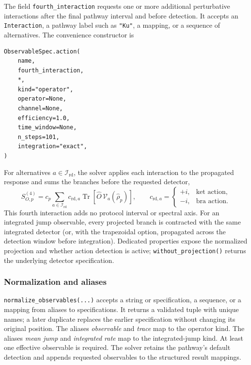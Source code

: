 \documentclass[11pt]{article}
\begin{document}
The field \texttt{fourth\_interaction} requests one or more additional perturbative interactions after the final pathway interval and before detection. It accepts an \texttt{Interaction}, a pathway label such as \texttt{"Ku"}, a mapping, or a sequence of alternatives. The convenience constructor is
\begin{verbatim}
ObservableSpec.action(
    name,
    fourth_interaction,
    *,
    kind="operator",
    operator=None,
    channel=None,
    efficiency=1.0,
    time_window=None,
    n_steps=101,
    integration="exact",
)
\end{verbatim}
For alternatives $a\in\mathcal{I}_{\mathrm{rd}}$, the solver applies each interaction to the propagated response and sums the branches before the requested detector,
\begin{equation}
    S_{O,p}^{(4)}=
    c_p\sum_{a\in\mathcal{I}_{\mathrm{rd}}}c_{\mathrm{rd},a}
    \operatorname{Tr}\!\left[\hat{O}\,\mathcal{V}_a(\hat{\rho}_p)\right],
    \qquad
    c_{\mathrm{rd},a}=\begin{cases}+i,&\text{ket action},\\-i,&\text{bra action}.
    \end{cases}
\end{equation}
This fourth interaction adds no protocol interval or spectral axis. For an integrated jump observable, every projected branch is contracted with the same integrated detector (or, with the trapezoidal option, propagated across the detection window before integration). Dedicated properties expose the normalized projection and whether action detection is active; \texttt{without\_projection()} returns the underlying detector specification.

\subsubsection{Normalization and aliases}

\texttt{normalize\_observables(...)} accepts a string or specification, a sequence, or a mapping from aliases to specifications. It returns a validated tuple with unique names; a later duplicate replaces the earlier specification without changing its original position. The aliases \emph{observable} and \emph{trace} map to the operator kind. The aliases \emph{mean jump} and \emph{integrated rate} map to the integrated-jump kind. At least one effective observable is required. The solver retains the pathway's default detection and appends requested observables to the structured result mappings.
\end{document}
